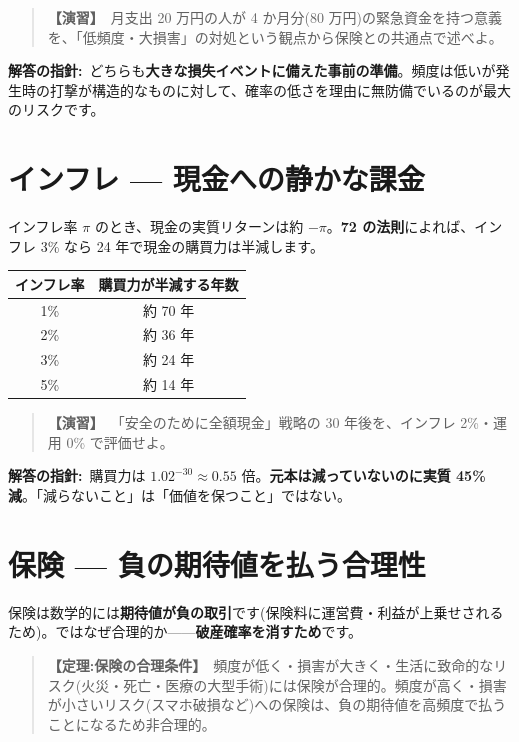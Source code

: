 \documentclass{article}
\begin{document}
\begin{quote}
\textbf{【演習】}\ 月支出 20 万円の人が 4 か月分(80 万円)の緊急資金を持つ意義を、「低頻度・大損害」の対処という観点から保険との共通点で述べよ。
\end{quote}

\textbf{解答の指針:}\ どちらも\textbf{大きな損失イベントに備えた事前の準備}。頻度は低いが発生時の打撃が構造的なものに対して、確率の低さを理由に無防備でいるのが最大のリスクです。

\section{インフレ — 現金への静かな課金}

インフレ率 \(\pi\) のとき、現金の実質リターンは約 \(-\pi\)。\textbf{72 の法則}によれば、インフレ 3\% なら 24 年で現金の購買力は半減します。

\begin{center}
\begin{tabular}{|c|c|}
\hline
インフレ率 & 購買力が半減する年数 \\
\hline
1\% & 約 70 年 \\
2\% & 約 36 年 \\
3\% & 約 24 年 \\
5\% & 約 14 年 \\
\hline
\end{tabular}
\end{center}

\begin{quote}
\textbf{【演習】}\ 「安全のために全額現金」戦略の 30 年後を、インフレ 2\%・運用 0\% で評価せよ。
\end{quote}

\textbf{解答の指針:}\ 購買力は \(1.02^{-30} \approx 0.55\) 倍。\textbf{元本は減っていないのに実質 45\% 減}。「減らないこと」は「価値を保つこと」ではない。

\section{保険 — 負の期待値を払う合理性}

保険は数学的には\textbf{期待値が負の取引}です(保険料に運営費・利益が上乗せされるため)。ではなぜ合理的か——\textbf{破産確率を消すため}です。

\begin{quote}
\textbf{【定理:保険の合理条件】}\ 頻度が低く・損害が大きく・生活に致命的なリスク(火災・死亡・医療の大型手術)には保険が合理的。頻度が高く・損害が小さいリスク(スマホ破損など)への保険は、負の期待値を高頻度で払うことになるため非合理的。
\end{quote}
\end{document}
